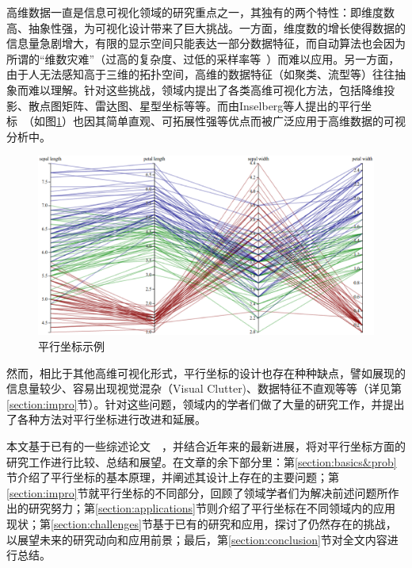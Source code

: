 \documentclass[12pt,twocolumn]{article}
\begin{document}
高维数据一直是信息可视化领域的研究重点之一，其独有的两个特性：即维度数高、抽象性强，为可视化设计带来了巨大挑战。一方面，维度数的增长使得数据的信息量急剧增大，有限的显示空间只能表达一部分数据特征，而自动算法也会因为所谓的“维数灾难”（过高的复杂度、过低的采样率等~\citep{Bellman1962}）而难以应用。另一方面，由于人无法感知高于三维的拓扑空间，高维的数据特征（如聚类、流型等）往往抽象而难以理解。针对这些挑战，领域内提出了各类高维可视化方法\citep{grinstein2001high}，包括降维投影\citep{fodor2002survey}、散点图矩阵\citep{cleveland1988dynamic}、雷达图\citep{hoffman1999dimensional}、星型坐标\citep{kandogan2000star}等等。而由Inselberg等人提出的平行坐标~\citep{inselberg1985plane}（如图\ref{fig:PC_demo}）也因其简单直观、可拓展性强等优点而被广泛应用于高维数据的可视分析中。

\begin{figure}[htb!]
\centering
\includegraphics[width=1.0\linewidth]{images/PC_demo.eps}
\caption{\label{fig:PC_demo}平行坐标示例
}
\end{figure}

然而，相比于其他高维可视化形式，平行坐标的设计也存在种种缺点，譬如展现的信息量较少、容易出现视觉混杂（Visual Clutter)、数据特征不直观等等（详见第\ref{section:impro}节）。针对这些问题，领域内的学者们做了大量的研究工作，并提出了各种方法对平行坐标进行改进和延展。

本文基于已有的一些综述论文~\citep{heinrich2013state}~\citep{siirtola2006interacting}，并结合近年来的最新进展，将对平行坐标方面的研究工作进行比较、总结和展望。在文章的余下部分里：第\ref{section:basics&prob}节介绍了平行坐标的基本原理，并阐述其设计上存在的主要问题；第\ref{section:impro}节就平行坐标的不同部分，回顾了领域学者们为解决前述问题所作出的研究努力；第\ref{section:applications}节则介绍了平行坐标在不同领域内的应用现状；第\ref{section:challenges}节基于已有的研究和应用，探讨了仍然存在的挑战，以展望未来的研究动向和应用前景；最后，第\ref{section:conclusion}节对全文内容进行总结。
\end{document}
